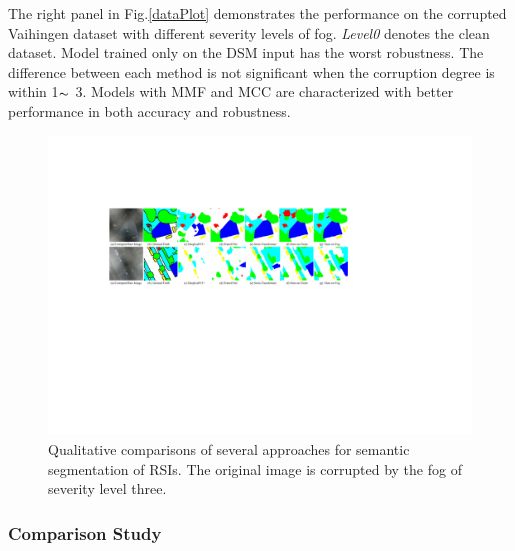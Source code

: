 \documentclass[lettersize,journal]{IEEEtran}
\begin{document}
The right panel in Fig.\ref{dataPlot} demonstrates the performance on the corrupted Vaihingen dataset with different severity levels of fog.  \emph{Level0} denotes the clean dataset. Model trained only on the DSM input has the worst robustness.  The difference between each method is not significant when the corruption degree is within 1$\thicksim $ 3. Models with MMF and MCC are characterized with better performance in both accuracy and robustness. 


\begin{figure}[!htbp]
    \centering
    \includegraphics[width=\columnwidth]{visualResult.pdf}
    \caption{Qualitative comparisons of several approaches for semantic segmentation of RSIs. The original image is corrupted by the fog of severity level three.
}
    \label{visualResult}
    \vspace{-0.5cm}  
\end{figure}

\subsubsection{Comparison Study}
\end{document}
